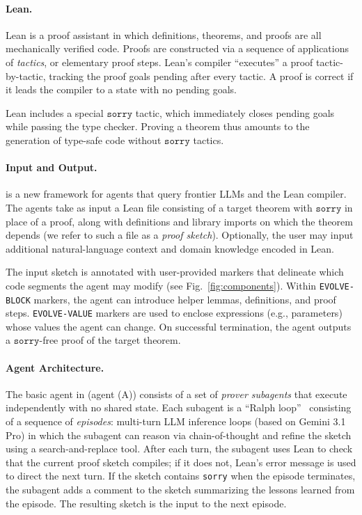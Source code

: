 \paragraph{Lean.} Lean \cite{moura2021lean} is a proof assistant in which definitions, theorems, and proofs are all mechanically verified code. Proofs are constructed via a sequence of applications of \emph{tactics}, or elementary proof steps. Lean's compiler ``executes'' a proof tactic-by-tactic, tracking the proof goals pending after every tactic. A proof is correct if it leads the compiler to a state with no pending goals.

Lean includes a special $\mathtt{sorry}$ tactic, which immediately closes pending goals while passing the type checker. Proving a theorem thus amounts to the generation of type-safe code without $\mathtt{sorry}$ tactics. 

\paragraph{Input and Output.} {\systemlong} is a new framework for agents that query frontier LLMs and the Lean compiler. The agents take as input a Lean file consisting of a target theorem with $\mathtt{sorry}$ in place of a proof, along with definitions and library imports on which the theorem depends (we refer to such a file as a \emph{proof sketch}). Optionally, the user may input additional natural-language context and domain knowledge encoded in Lean. 

The input sketch is annotated with user-provided markers that delineate which code segments the agent may modify (see Fig.~\ref{fig:components}).
Within \texttt{EVOLVE-BLOCK} markers, the agent can introduce helper lemmas, definitions, and proof steps. \texttt{EVOLVE-VALUE} markers are used to enclose expressions (e.g., parameters) whose values the agent can change. On successful termination, the agent outputs a $\mathtt{sorry}$-free proof of the target theorem.

\paragraph{Agent Architecture.} 
The basic agent in {\systemlong} (agent (A)) consists of a set of \emph{prover subagents} that execute independently with no shared state. Each subagent 
is a ``Ralph loop''~\cite{huntley2025ralph} consisting of a sequence of \emph{episodes}: multi-turn LLM inference loops (based on Gemini 3.1 Pro) in which the subagent can reason via chain-of-thought and refine the sketch using a search-and-replace tool. After each turn, the subagent uses Lean to check that the current proof sketch compiles; if it does not, Lean's error message is used to direct the next turn. If the sketch contains \texttt{sorry} when the episode terminates, the subagent adds a comment to the sketch summarizing the lessons learned from the episode. The resulting sketch is the input to the next episode. 

